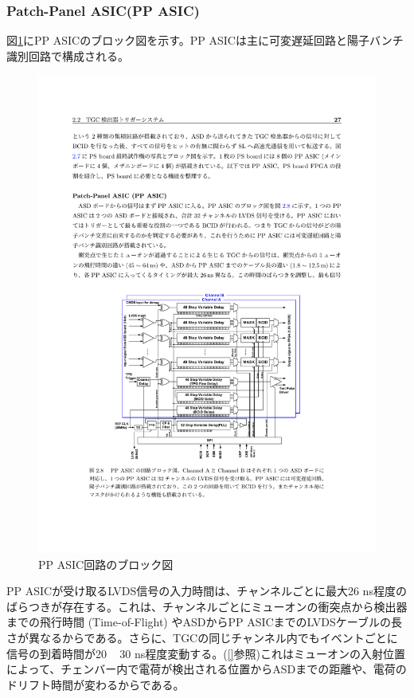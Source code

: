     \subsubsection*{Patch-Panel ASIC(PP ASIC)}
    図\ref{TGC_PPASIC}にPP ASICのブロック図を示す。PP ASICは主に可変遅延回路と陽子バンチ識別回路で構成される。

    \begin{figure} 
    \centering
    \includegraphics[width=16cm]{fig/Intro/TGC_PPASIC.pdf}
    \caption[PP ASIC回路のブロック図]{PP ASIC回路のブロック図\cite{PPASIC}}
    \label{TGC_PPASIC}
    \end{figure}

    PP ASICが受け取るLVDS信号の入力時間は、チャンネルごとに最大26 ns程度のばらつきが存在する。これは、チャンネルごとにミューオンの衝突点から検出器までの飛行時間 (Time-of-Flight) やASDからPP ASICまでのLVDSケーブルの長さが異なるからである。さらに、TGCの同じチャンネル内でもイベントごとに信号の到着時間が20 ~ 30 ns程度変動する。(\ref{}参照)これはミューオンの入射位置によって、チェンバー内で電荷が検出される位置からASDまでの距離や、電荷のドリフト時間が変わるからである。

